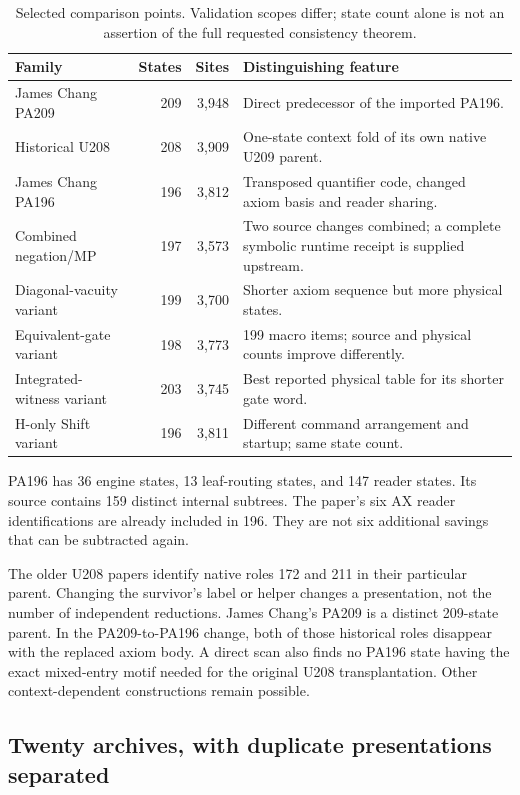 \documentclass[11pt,letterpaper]{article}
\begin{document}
\begin{table}[ht]
\centering\small
\begin{tabular}{@{}lrrp{7.2cm}@{}}
\toprule
Family & States & Sites & Distinguishing feature \\
\midrule
James Chang PA209 &209&3,948&Direct predecessor of the imported PA196.\\
Historical U208 &208&3,909&One-state context fold of its own native U209 parent.\\
James Chang PA196 &196&3,812&Transposed quantifier code, changed axiom basis and reader sharing.\\
Combined negation/MP &197&3,573&Two source changes combined; a complete symbolic runtime receipt is supplied upstream.\\
Diagonal-vacuity variant &199&3,700&Shorter axiom sequence but more physical states.\\
Equivalent-gate variant &198&3,773&199 macro items; source and physical counts improve differently.\\
Integrated-witness variant &203&3,745&Best reported physical table for its shorter gate word.\\
H-only Shift variant &196&3,811&Different command arrangement and startup; same state count.\\
\bottomrule
\end{tabular}
\caption{Selected comparison points. Validation scopes differ; state count
alone is not an assertion of the full requested consistency theorem.}
\end{table}

PA196 has 36 engine states, 13 leaf-routing states, and 147 reader states.
Its source contains 159 distinct internal subtrees. The paper's six AX
reader identifications are already included in 196. They are not six
additional savings that can be subtracted again.

The older U208 papers identify native roles 172 and 211 in their particular
parent. Changing the survivor's label or helper changes a presentation, not
the number of independent reductions. James Chang's PA209 is a distinct
209-state parent. In the PA209-to-PA196 change, both of those historical
roles disappear with the replaced axiom body. A direct scan also finds no
PA196 state having the exact mixed-entry motif needed for the original
U208 transplantation. Other context-dependent constructions remain possible.

\subsection{Twenty archives, with duplicate presentations separated}
\end{document}
